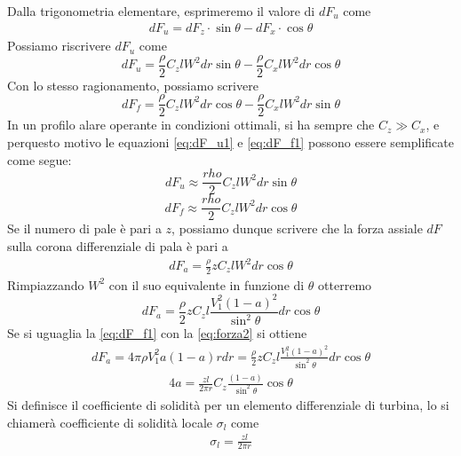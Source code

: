 Dalla trigonometria elementare, esprimeremo il valore di $dF_u$ come
\begin{align*}
dF_u = dF_z \cdot \sin \theta - dF_x \cdot \cos \theta
\end{align*}
Possiamo riscrivere $dF_u$ come
\begin{equation}\label{eq:dF_u1}
dF_u = \frac{\rho}{2} C_z l W^2 dr \sin \theta - \frac{\rho}{2} C_x l W^2 dr \cos \theta
\end{equation}
Con lo stesso ragionamento, possiamo scrivere
\begin{equation}\label{eq:dF_f1}
dF_f = \frac{\rho}{2} C_z l W^2 dr \cos \theta - \frac{\rho}{2} C_x l W^2 dr \sin \theta
\end{equation}
In un profilo alare operante in condizioni ottimali, si ha sempre che $C_z \gg C_x$, e perquesto motivo le equazioni \ref{eq:dF_u1} e \ref{eq:dF_f1} possono essere semplificate come segue:
\begin{equation}\label{eq:dF_u2}
dF_u \approx \frac{rho}{2} C_zl W^2 dr \sin \theta
\end{equation}
\begin{equation}\label{eq:dF_f2}
dF_f \approx \frac{rho}{2} C_zl W^2 dr \cos \theta
\end{equation}
Se il numero di pale è pari a $z$, possiamo dunque scrivere che la forza assiale $dF$ sulla corona differenziale di pala è pari a
\begin{align*}
dF_a = \frac{\rho}{2} z C_z l W^2 dr \cos \theta
\end{align*}
Rimpiazzando $W^2$ con il suo equivalente in funzione di $\theta$ otterremo
\begin{equation}
dF_a = \frac{\rho}{2} z C_z l \frac{V_1^2 \left( 1- a \right)^2}{\sin^2 \theta} dr \cos \theta
\end{equation}
Se si uguaglia la \ref{eq:dF_f1} con la \ref{eq:forza2} si ottiene
\begin{align*}
dF_a = 4 \pi \rho V_1^2 a \left( 1-a \right) r dr = \frac{\rho}{2} z C_z l \frac{V_1^2 \left( 1- a \right)^2 }{\sin^2 \theta} dr \cos \theta
\end{align*}
\begin{align*}
4 a = \frac{z l }{2 \pi r} C_z \frac{\left( 1- a \right)}{\sin^2 \theta} \cos \theta
\end{align*}
Si definisce il coefficiente di solidità per un elemento differenziale di turbina, lo si chiamerà coefficiente di solidità locale $\sigma_l$ come
\begin{align*}
\sigma_l = \frac{z l}{2 \pi r}
\end{align*}
